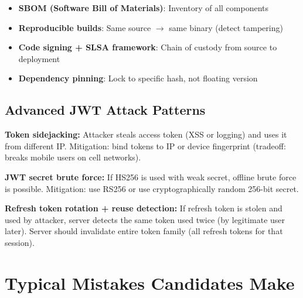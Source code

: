 \documentclass[11pt]{article}
\providecommand{\tightlist}{\setlength{\itemsep}{1pt}\setlength{\parskip}{0pt}}
\begin{document}
\begin{itemize}
\tightlist
\item
  \textbf{SBOM (Software Bill of Materials)}: Inventory of all components
\item
  \textbf{Reproducible builds}: Same source \(\rightarrow\) same binary (detect tampering)
\item
  \textbf{Code signing + SLSA framework}: Chain of custody from source to deployment
\item
  \textbf{Dependency pinning}: Lock to specific hash, not floating version
\end{itemize}

\subsection{Advanced JWT Attack Patterns}\label{advanced-jwt-attack-patterns}

\textbf{Token sidejacking:} Attacker steals access token (XSS or logging) and uses it from different IP. Mitigation: bind tokens to IP or device fingerprint (tradeoff: breaks mobile users on cell networks).

\textbf{JWT secret brute force:} If HS256 is used with weak secret, offline brute force is possible. Mitigation: use RS256 or use cryptographically random 256-bit secret.

\textbf{Refresh token rotation + reuse detection:} If refresh token is stolen and used by attacker, server detects the same token used twice (by legitimate user later). Server should invalidate entire token family (all refresh tokens for that session).

\section{Typical Mistakes Candidates Make}\label{typical-mistakes-candidates-make}
\end{document}
